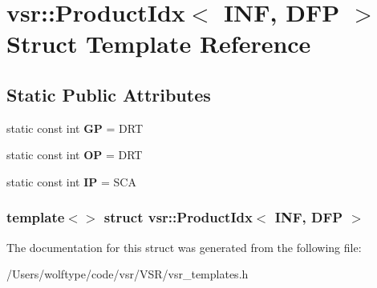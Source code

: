 \hypertarget{structvsr_1_1_product_idx_3_01_i_n_f_00_01_d_f_p_01_4}{\section{vsr\-:\-:Product\-Idx$<$ I\-N\-F, D\-F\-P $>$ Struct Template Reference}
\label{structvsr_1_1_product_idx_3_01_i_n_f_00_01_d_f_p_01_4}
}
\subsection*{Static Public Attributes}
\begin{DoxyCompactItemize}
\item 
\hypertarget{structvsr_1_1_product_idx_3_01_i_n_f_00_01_d_f_p_01_4_a0d02780c247e9ca843fbb0205c040ad2}{static const int {\bfseries G\-P} = D\-R\-T}\label{structvsr_1_1_product_idx_3_01_i_n_f_00_01_d_f_p_01_4_a0d02780c247e9ca843fbb0205c040ad2}

\item 
\hypertarget{structvsr_1_1_product_idx_3_01_i_n_f_00_01_d_f_p_01_4_a3408db35687b2fb9a116918bf5cc85a3}{static const int {\bfseries O\-P} = D\-R\-T}\label{structvsr_1_1_product_idx_3_01_i_n_f_00_01_d_f_p_01_4_a3408db35687b2fb9a116918bf5cc85a3}

\item 
\hypertarget{structvsr_1_1_product_idx_3_01_i_n_f_00_01_d_f_p_01_4_a6238083041881c8841c402a41fcac3ea}{static const int {\bfseries I\-P} = S\-C\-A}\label{structvsr_1_1_product_idx_3_01_i_n_f_00_01_d_f_p_01_4_a6238083041881c8841c402a41fcac3ea}

\end{DoxyCompactItemize}
\subsubsection*{template$<$$>$ struct vsr\-::\-Product\-Idx$<$ I\-N\-F, D\-F\-P $>$}



The documentation for this struct was generated from the following file\-:\begin{DoxyCompactItemize}
\item 
/\-Users/wolftype/code/vsr/\-V\-S\-R/vsr\-\_\-templates.\-h\end{DoxyCompactItemize}
